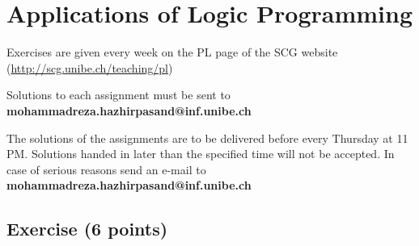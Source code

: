 \documentclass [11pt, a4wide, twoside]{article}
\begin{document}
\section*{\space{} Applications of Logic Programming}


\begin{myitemize}
\item Exercises are given every week on the PL page of the SCG website \\ (\url{http://scg.unibe.ch/teaching/pl})
\item Solutions to each assignment must be sent to \textbf{mohammadreza.hazhirpasand@inf.unibe.ch}
\item The solutions of the assignments are to be delivered before every Thursday at 11 PM. Solutions handed in later than the specified time will not be accepted. In case of serious reasons send an e-mail to  \textbf{mohammadreza.hazhirpasand@inf.unibe.ch}
\end{myitemize}


\subsection*{Exercise (6 points)}
\end{document}
